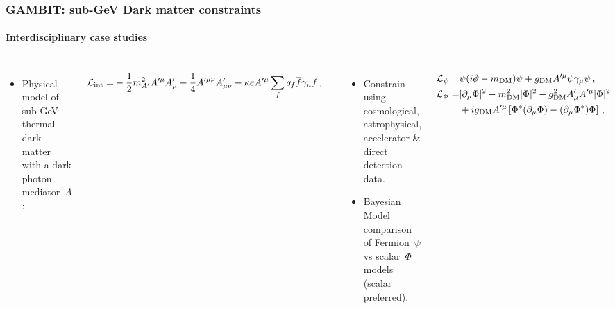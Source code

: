 \documentclass[aspectratio=169]{beamer}
\begin{document}
\begin{frame}
    \frametitle{GAMBIT: sub-GeV Dark matter constraints}
    \framesubtitle{Interdisciplinary case studies}
    \begin{columns}
        \begin{itemize}
            \item Physical model of sub-GeV thermal dark matter with a dark photon mediator~$A$:
        \end{itemize}
        \vspace{-10pt}
        \begin{align*}
        \small
            \mathcal{L}_\text{int} =& -\frac{1}{2} m_{A'}^2 A'^\mu A'_\mu - \frac{1}{4} A'^{\mu\nu}A'_{\mu\nu} -\kappa e A'^\mu \sum_{f} q_f \overline{f} \gamma_\mu f \,,
            \normalsize
        \end{align*}
        \vspace{-15pt}
        \begin{itemize}
            \item Constrain using cosmological, astrophysical, accelerator \& direct detection data.
            \item Bayesian Model comparison of Fermion~$\psi$ vs scalar~$\Phi$ models (scalar preferred).
        \end{itemize}
        \vspace{-10pt}
        \begin{align*}
            \small
            \mathcal{L}_\psi  =& \bar{\psi}(i \slashed{\partial} - m_\text{DM}) \psi + g_\text{DM} A'^\mu \bar{\psi} \gamma_\mu \psi \,,\\
            \mathcal{L}_\Phi  =& |\partial_\mu \Phi|^2 - m_\text{DM}^2 |\Phi|^2 - g_\text{DM}^2 A'_\mu A'^\mu |\Phi|^2 \\ &+ i g_\text{DM} A'^\mu \left[\Phi^\ast (\partial_\mu \Phi) - (\partial_\mu \Phi^\ast) \Phi\right]\,,
        \normalsize
        \end{align*}

\end{columns}
\end{frame}
\end{document}
